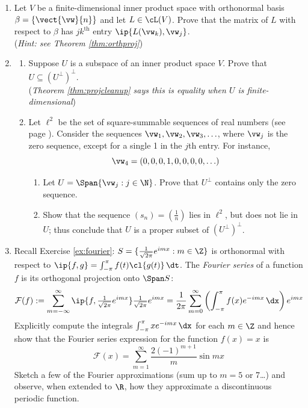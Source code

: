 \begin{exercises}
\begin{enumerate}[label=\thesubsection.\arabic*., align=right]
  \item\label{ex:fdipsmatrix} Let $V$ be a finite-dimensional inner product space with orthonormal basis $\beta=\{\vect{\vw}{n}\}$ and let $L\in\cL(V)$. Prove that the matrix of $L$ with respect to $\beta$ has $jk^\text{th}$ entry $\ip{L(\vw_k),\vw_j}$.\\
  (\emph{Hint: see Theorem \ref{thm:orthproj}})
  
  \item\label{ex:uperpperp}\begin{enumerate}
    \item Suppose $U$ is a subspace of an inner product space $V$. Prove that $U\subseteq (U^\perp)^\perp$.\\
    (\emph{Theorem \ref{thm:projcleanup} says this is equality when $U$ is finite-dimensional})
    \item Let $\ell^2$ be the set of square-summable sequences of real numbers (see page \pageref{ell2ip}). Consider the sequences $\vw_1,\vw_2,\vw_3,\ldots$, where $\vw_j$ is the zero sequence, except for a single 1 in the $j$th entry. For instance,
 		\[\vw_4=(0,0,0,1,0,0,0,0,\ldots)\]
  	\begin{enumerate}
    	\item Let $U=\Span\{\vw_j:j\in\N\}$. Prove that $U^\perp$ contains only the zero sequence.
    	\item Show that the sequence $(s_n)=\left(\frac 1n\right)$ lies in $\ell^2$, but does not lie in $U$; thus conclude that $U$ is a proper subset of $(U^\perp)^\perp$.
  	\end{enumerate}
  \end{enumerate}
  
  
  \item Recall Exercise \ref{ex:fourier}: $S=\{\frac 1{\sqrt{2\pi}}e^{imx}:m\in\Z\}$ is orthonormal with respect to $\ip{f,g}=\int_{-\pi}^\pi f(t)\cl{g(t)}\,\dt$. The \emph{Fourier series} of a function $f$ is its orthogonal projection onto $\Span S$:
  \[\mathcal{F}(f):=\sum_{m=-\infty}^\infty \ip{f,\tfrac 1{\sqrt{2\pi}}e^{imx}}\tfrac 1{\sqrt{2\pi}}e^{imx} =\frac 1{2\pi} \sum_{m=0}^\infty\left(\int_{-\pi}^\pi f(x)e^{-imx}\,\dx\right)e^{imx}\]
  Explicitly compute the integrals $\int_{-\pi}^\pi xe^{-imx}\,\dx$ for each $m\in\Z$ and hence show that the Fourier series expression for the function $f(x)=x$ is
  \[\mathcal{F}(x)=\sum_{m=1}^\infty\frac{2(-1)^{m+1}}m\sin mx\]
  Sketch a few of the Fourier approximations (sum up to $m=5$ or 7\ldots) and observe, when extended to $\R$, how they approximate a discontinuous periodic function. 
\end{enumerate}
\end{exercises}


